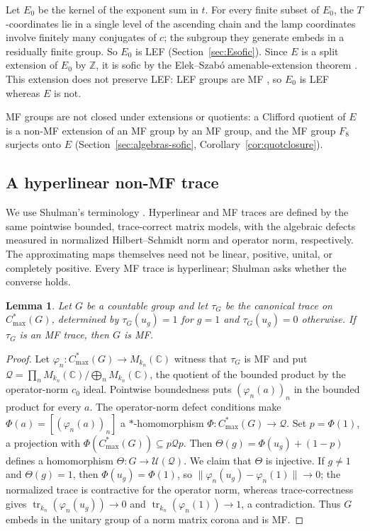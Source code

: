 \documentclass[11pt]{amsart}
\newcommand{\leanverified}[2]{\ignorespaces}
\newtheorem{lemma}[theorem]{Lemma}
\theoremstyle{definition}
\theoremstyle{remark}
\theoremstyle{plain}
\newcommand{\C}{\mathbb C}
\newcommand{\Z}{\mathbb Z}
\newcommand{\U}{\mathcal U}
\newcommand{\Cmax}{C^*_{\mathrm{max}}}
\begin{document}
Let $E_0$ be the kernel of the exponent sum in $t$.  For every finite
subset of $E_0$, the $T$-coordinates lie in a single level of the
ascending chain and the lamp coordinates involve finitely many
conjugates of $c$; the subgroup they generate embeds in a residually
finite group.  So $E_0$ is LEF (Section~\ref{sec:Esofic}).  Since
$E$ is a split extension of $E_0$ by $\Z$, it is sofic by the
Elek--Szab\'o amenable-extension theorem \cite{ElekSzabo}.  This
extension does not preserve LEF: LEF groups are MF \cite{CDE}, so
$E_0$ is LEF whereas $E$ is not.

MF groups are not closed under extensions or quotients: a
Clifford quotient of $E$ is a non-MF extension of an MF group by an
MF group, and the MF group $F_8$ surjects onto $E$
(Section~\ref{sec:algebras-sofic}, Corollary~\ref{cor:quotclosure}).

\subsection*{A hyperlinear non-MF trace}

We use Shulman's terminology \cite{ShulmanTraces}.  Hyperlinear and MF
traces are defined by the same pointwise bounded, trace-correct matrix
models, with the algebraic defects measured in normalized
Hilbert--Schmidt norm and operator norm, respectively.  The
approximating maps themselves need not be linear, positive, unital, or
completely positive.  Every MF trace is hyperlinear; Shulman asks
whether the converse holds.

\begin{lemma}
\label{lem:mftrace-group}
Let $G$ be a countable group and let $\tau_G$ be the canonical trace on
$\Cmax(G)$, determined by $\tau_G(u_g)=1$ for $g=1$ and $\tau_G(u_g)=0$
otherwise.  If $\tau_G$ is an MF trace, then $G$ is MF\@.
\leanverified{Sofic/TraceSeparationEndpoint}{GroupApproximation.manuscriptMFTraceGroupBridge}
\end{lemma}

\begin{proof}
Let $\varphi_n\colon\Cmax(G)\to M_{k_n}(\C)$ witness that $\tau_G$ is MF
and put $\mathcal Q=\prod_n M_{k_n}(\C)\big/\bigoplus_n M_{k_n}(\C)$,
the quotient of the bounded product by the operator-norm $c_0$ ideal.
Pointwise boundedness puts $(\varphi_n(a))_n$ in the bounded product for
every $a$.  The operator-norm defect conditions make
$\Phi(a)=[(\varphi_n(a))_n]$ a $*$-homomorphism
$\Phi\colon\Cmax(G)\to\mathcal Q$.  Set $p=\Phi(1)$, a projection with
$\Phi(\Cmax(G))\subseteq p\mathcal Qp$.  Then
$\Theta(g)=\Phi(u_g)+(1-p)$ defines a homomorphism
$\Theta\colon G\to\U(\mathcal Q)$.  We claim that $\Theta$ is
injective.  If $g\ne1$ and $\Theta(g)=1$, then $\Phi(u_g)=\Phi(1)$, so
$\lVert\varphi_n(u_g)-\varphi_n(1)\rVert\to0$; the normalized trace is
contractive for the operator norm, whereas trace-correctness gives
$\operatorname{tr}_{k_n}(\varphi_n(u_g))\to0$ and
$\operatorname{tr}_{k_n}(\varphi_n(1))\to1$, a contradiction.  Thus $G$
embeds in the unitary group of a norm matrix corona and is MF.
\end{proof}
\end{document}
